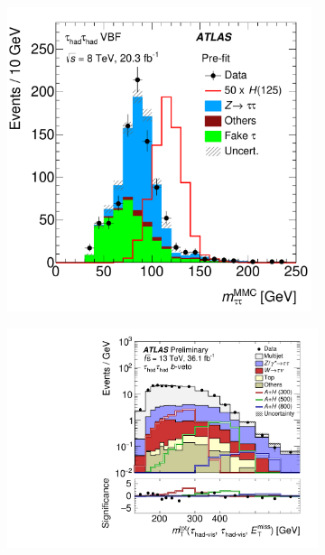 \begin{figure}[htb]
  \begin{subfigure}[t]{0.48\textwidth}
    \centering
    \includegraphics[width=0.98\textwidth]{./figures/theory/htautau_mass_2.pdf}
    \label{fig:mtautau_mmc}
  \end{subfigure}\hfill
  \begin{subfigure}[t]{0.48\textwidth}
    \centering
    \includegraphics[width=1.0\textwidth]{./figures/theory/zprime_mttot.pdf}
    \label{fig:mttot_mssm}
  \end{subfigure}
  \caption{}
\end{figure}


